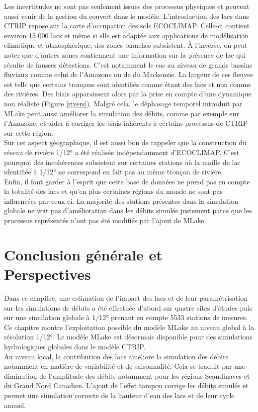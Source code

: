 Les incertitudes ne sont pas seulement issues des processus physiques et peuvent aussi venir de la gestion du couvert dans le modèle. L'introduction des lacs dans CTRIP repose sur la carte d'occupation des sols ECOCLIMAP. Celle-ci contient environ 15 000 lacs et même si elle est adaptée aux applications de modélisation climatique et atmosphérique, des zones blanches subsistent. À l'inverse, on peut noter que d'autres zones contiennent une information sur la présence de lac qui résulte de fausses détections. C'est notamment le cas au niveau de grands bassins fluviaux comme celui de l'Amazone ou de du Mackenzie. La largeur de ces fleuves est telle que certains tronçons sont identifiés comme étant des lacs et non comme des rivières. Des biais apparaissent alors par la prise en compte d'une dynamique non réaliste (Figure \ref{rivers}). Malgré cela, le déphasage temporel introduit par MLake peut aussi améliorer la simulation des débits, comme par exemple sur l'Amazone, et aider à corriger les biais inhérents à certains processus de CTRIP sur cette région. \\
Sur cet aspect géographique, il est aussi bon de rappeler que la construction du réseau de rivière 1/12° a été réalisée indépendamment d'ECOCLIMAP. C'est pourquoi des incohérences subsistent sur certaines stations où la maille de lac identifiée à 1/12° ne correspond en fait pas au même tronçon de rivière.\\
Enfin, il faut garder à l'esprit que cette base de données ne prend pas en compte la totalité des lacs et qu'en plus certaines régions du monde ne sont pas influencées par ceux-ci. La majorité des stations présentes dans la simulation globale ne voit pas d'amélioration dans les débits simulés justement parce que les processus représentés n'ont pas été modifiés par l'ajout de MLake.\\

\clearpage
\section{{\selectfont Conclusion générale et Perspectives}}

Dans ce chapitre, une estimation de l'impact des lacs et de leur paramétrisation sur les simulations de débits a été effectuée d'abord sur quatre sites d'études puis sur une simulation globale à 1/12° prenant en compte 5533 stations de mesures. Ce chapitre montre l'exploitation possible du modèle MLake au niveau global à la résolution 1/12°. Le modèle MLake est désormais disponible pour des simulations hydrologiques globales dans le modèle CTRIP.\\
Au niveau local, la contribution des lacs améliore la simulation des débits notamment en matière de variabilité et de saisonnalité. Cela se traduit par une diminution de l'amplitude des débits notamment pour les régions Scandinaves et du Grand Nord Canadien. L'ajout de l'effet tampon corrige les débits simulés et permet une simulation correcte de la hauteur d'eau des lacs et de leur cycle annuel.\\

